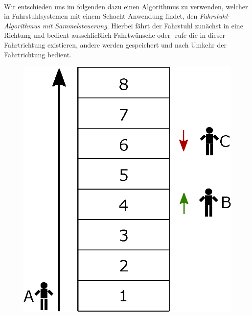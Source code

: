 \paragraph{}Wir entschieden uns im folgenden dazu einen Algorithmus zu verwenden, welcher in Fahrstuhlsystemen mit einem Schacht Anwendung findet, den \textit{Fahrstuhl-Algorithmus mit Sammelsteuerung}\cite{wiki_elev}. Hierbei fährt der Fahrstuhl zunächst in eine Richtung und bedient ausschließlich Fahrtwünsche oder -rufe die in dieser Fahrtrichtung existieren, andere werden gespeichert und nach Umkehr der Fahrtrichtung bedient.

\begin{figure}[h]
	\begin{minipage}{0.47\textwidth}
		\includegraphics[width=\textwidth]{images/algo_example.eps}
	\end{minipage}
	\hfill
	\begin{minipage}{0.47\textwidth}

\end{minipage}
\end{figure}

